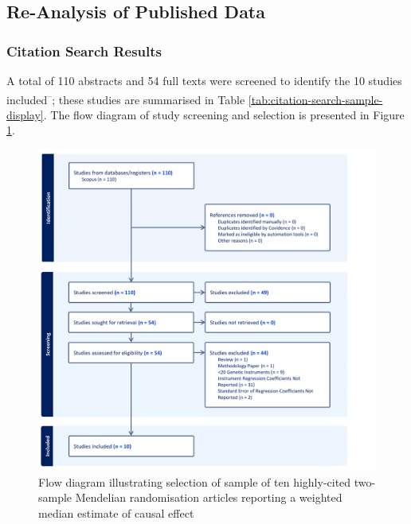 \documentclass[
]{article}
\begin{document}
\newpage

\subsection{Re-Analysis of Published Data}\label{re-analysis-of-published-data-1}

\subsubsection{Citation Search Results}\label{citation-search-results}

A total of 110 abstracts and 54 full texts were screened to identify the 10 studies included\textsuperscript{--}; these studies are summarised in Table \ref{tab:citation-search-sample-display}. The flow diagram of study screening and selection is presented in Figure \ref{fig:screening-flow}.

\begin{figure}
\includegraphics[width=1\linewidth]{Data/Citations_Search/WME_citation_search_flow_diagram_crop} \caption{Flow diagram illustrating selection of sample of ten highly-cited two-sample Mendelian randomisation articles reporting a weighted median estimate of causal effect}\label{fig:screening-flow}
\end{figure}
\end{document}

